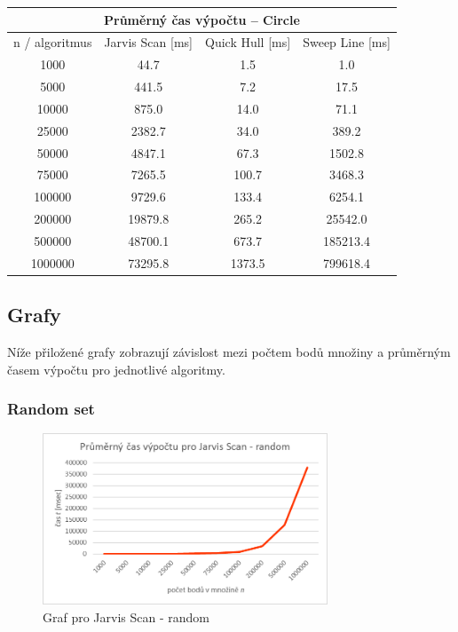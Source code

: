 \documentclass[a4paper, 12pt]{article}
\begin{document}
\begin{table}[]
\centering
\begin{tabular}{|c|c|c|c|}
\hline
\multicolumn{4}{|c|}{\textbf{Průměrný čas výpočtu – Circle}}                	  \\ \hline
n / algoritmus & Jarvis Scan {[}ms{]} & Quick Hull {[}ms{]} & Sweep Line {[}ms{]} \\ \hline
1000           & 44.7                 & 1.5                 & 1.0                 \\ \hline
5000           & 441.5                & 7.2                 & 17.5                \\ \hline
10000          & 875.0                & 14.0                & 71.1                \\ \hline
25000          & 2382.7               & 34.0                & 389.2               \\ \hline
50000          & 4847.1               & 67.3                & 1502.8              \\ \hline
75000          & 7265.5               & 100.7               & 3468.3              \\ \hline
100000         & 9729.6               & 133.4               & 6254.1              \\ \hline
200000         & 19879.8              & 265.2               & 25542.0             \\ \hline
500000         & 48700.1              & 673.7               & 185213.4            \\ \hline
1000000        & 73295.8              & 1373.5              & 799618.4            \\ \hline
\end{tabular}
\end{table}

\clearpage

\subsection{Grafy}
Níže přiložené grafy zobrazují závislost mezi počtem bodů množiny a průměrným časem výpočtu pro jednotlivé algoritmy. 

\subsubsection{Random set}
\begin{figure}[h!]
	\centering
	\includegraphics[width=8.5cm]{./pictures/g_rand_js.png}
	\caption{Graf pro Jarvis Scan - random}
\end{figure}
\end{document}
